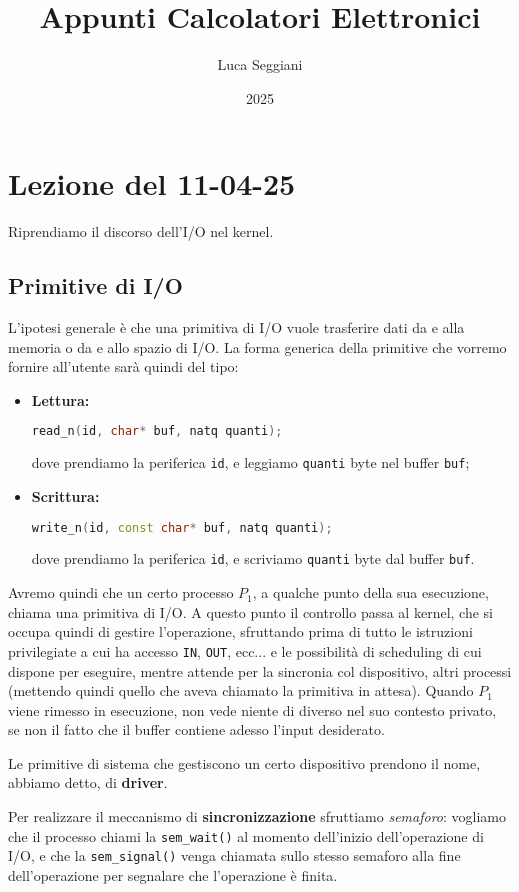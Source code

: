 \documentclass[a4paper,11pt]{article}
\title{Appunti Calcolatori Elettronici}
\author{Luca Seggiani}
\date{2025}
\begin{document}
\section{Lezione del 11-04-25}

\thispagestyle{empty}
\pagestyle{fancy}

Riprendiamo il discorso dell'I/O nel kernel.

\subsection{Primitive di I/O}
L'ipotesi generale è che una primitiva di I/O vuole trasferire dati da e alla memoria o da e allo spazio di I/O.
La forma generica della primitive che vorremo fornire all'utente sarà quindi del tipo:
\begin{itemize}
	\item \textbf{Lettura:}
\begin{lstlisting}[language=C++, style=codestyle]
read_n(id, char* buf, natq quanti);
\end{lstlisting}
dove prendiamo la periferica \lstinline|id|, e leggiamo \lstinline|quanti| byte nel buffer \lstinline|buf|;
	\item \textbf{Scrittura:}
\begin{lstlisting}[language=C++, style=codestyle]
write_n(id, const char* buf, natq quanti);
\end{lstlisting}
dove prendiamo la periferica \lstinline|id|, e scriviamo \lstinline|quanti| byte dal buffer \lstinline|buf|.
\end{itemize}

Avremo quindi che un certo processo $P_1$, a qualche punto della sua esecuzione, chiama una primitiva di I/O.
A questo punto il controllo passa al kernel, che si occupa quindi di gestire l'operazione, sfruttando prima di tutto le istruzioni privilegiate a cui ha accesso \lstinline|IN|, \lstinline|OUT|, ecc... e le possibilità di scheduling di cui dispone per eseguire, mentre attende per la sincronia col dispositivo, altri processi (mettendo quindi quello che aveva chiamato la primitiva in attesa).
Quando $P_1$ viene rimesso in esecuzione, non vede niente di diverso nel suo contesto privato, se non il fatto che il buffer contiene adesso l'input desiderato.

Le primitive di sistema che gestiscono un certo dispositivo prendono il nome, abbiamo detto, di \textbf{driver}.

Per realizzare il meccanismo di \textbf{sincronizzazione} sfruttiamo \textit{semaforo}: vogliamo che il processo chiami la \lstinline|sem_wait()| al momento dell'inizio dell'operazione di I/O, e che la \lstinline|sem_signal()| venga chiamata sullo stesso semaforo alla fine dell'operazione per segnalare che l'operazione è finita.
\end{document}
